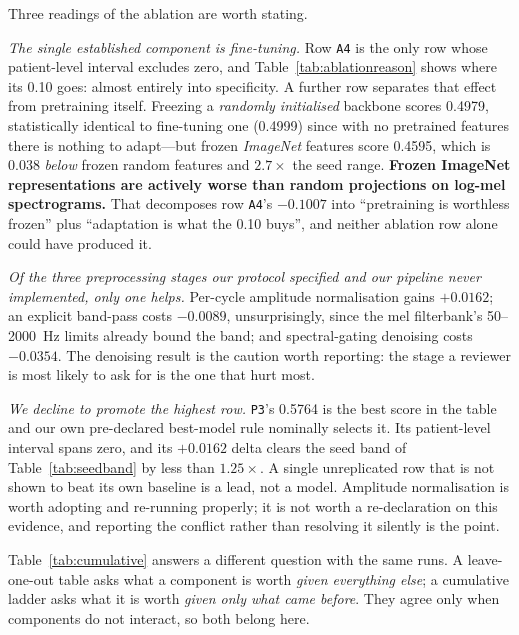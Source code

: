 \documentclass[journal,onecolumn]{IEEEtran}
\begin{document}
Three readings of the ablation are worth stating.

\emph{The single established component is fine-tuning.} Row \texttt{A4} is the only
row whose patient-level interval excludes zero, and
Table~\ref{tab:ablationreason} shows where its 0.10 goes: almost entirely into
specificity. A further row separates that effect from pretraining itself. Freezing
a \emph{randomly initialised} backbone scores 0.4979, statistically identical to
fine-tuning one (0.4999) since with no pretrained features there is nothing to
adapt---but frozen \emph{ImageNet} features score 0.4595, which is 0.038
\emph{below} frozen random features and $2.7\times$ the seed range.
\textbf{Frozen ImageNet representations are actively worse than random projections
on log-mel spectrograms.} That decomposes row \texttt{A4}'s $-0.1007$ into
``pretraining is worthless frozen'' plus ``adaptation is what the 0.10 buys'', and
neither ablation row alone could have produced it.

\emph{Of the three preprocessing stages our protocol specified and our pipeline
never implemented, only one helps.} Per-cycle amplitude normalisation gains
$+0.0162$; an explicit band-pass costs $-0.0089$, unsurprisingly, since the mel
filterbank's 50--2000~Hz limits already bound the band; and spectral-gating
denoising costs $-0.0354$. The denoising result is the caution worth reporting:
the stage a reviewer is most likely to ask for is the one that hurt most.

\emph{We decline to promote the highest row.} \texttt{P3}'s 0.5764 is the best
score in the table and our own pre-declared best-model rule nominally selects it.
Its patient-level interval spans zero, and its $+0.0162$ delta clears the seed band
of Table~\ref{tab:seedband} by less than $1.25\times$. A single unreplicated row
that is not shown to beat its own baseline is a lead, not a model. Amplitude
normalisation is worth adopting and re-running properly; it is not worth a
re-declaration on this evidence, and reporting the conflict rather than resolving
it silently is the point.

Table~\ref{tab:cumulative} answers a different question with the same runs. A
leave-one-out table asks what a component is worth \emph{given everything else}; a
cumulative ladder asks what it is worth \emph{given only what came before}. They
agree only when components do not interact, so both belong here.
\end{document}
